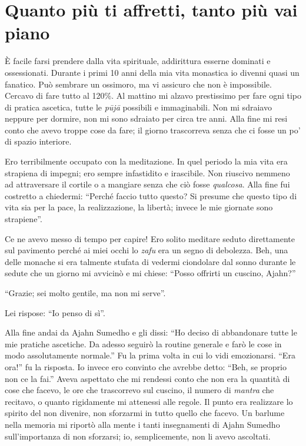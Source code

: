 \section*{Quanto pi\`u ti affretti, tanto pi\`u vai piano}

È facile farsi prendere dalla vita spirituale, addirittura esserne dominati e ossessionati. Durante i primi 10 anni della mia vita monastica io divenni quasi un fanatico. Può sembrare un ossimoro, ma vi assicuro che non è impossibile. Cercavo di fare tutto al 120\%. Al mattino mi alzavo prestissimo per fare ogni tipo di pratica ascetica, tutte le \textit{pūjā} possibili e immaginabili. Non mi sdraiavo neppure per dormire, non mi sono sdraiato per circa tre anni. Alla fine mi resi conto che avevo troppe cose da fare; il giorno trascorreva senza che ci fosse un po' di spazio interiore.

Ero terribilmente occupato con la meditazione. In quel periodo la mia vita era strapiena di impegni; ero sempre infastidito e irascibile. Non riuscivo nemmeno ad attraversare il cortile o a mangiare senza che ciò fosse \textit{qualcosa}. Alla fine fui costretto a chiedermi: ``Perché faccio tutto questo? Si presume che questo tipo di vita sia per la pace, la realizzazione, la libertà; invece le mie giornate sono strapiene''.

Ce ne avevo messo di tempo per capire! Ero solito meditare seduto direttamente sul pavimento perché ai miei occhi lo \textit{zafu} era un segno di debolezza. Beh, una delle monache si era talmente stufata di vedermi ciondolare dal sonno durante le sedute che un giorno mi avvicinò e mi chiese: ``Posso offrirti un cuscino, Ajahn?''

``Grazie; sei molto gentile, ma non mi serve''.

Lei rispose: ``Io penso di sì''.

Alla fine andai da Ajahn Sumedho e gli dissi: ``Ho deciso di abbandonare tutte le mie pratiche ascetiche. Da adesso seguirò la routine generale e farò le cose in modo assolutamente normale.'' Fu la prima volta in cui lo vidi emozionarsi. ``Era ora!'' fu la risposta. Io invece ero convinto che avrebbe detto: ``Beh, se proprio non ce la fai.'' Aveva aspettato che mi rendessi conto che non era la quantità di cose che facevo, le ore che trascorrevo sul cuscino, il numero di \textit{mantra} che recitavo, o quanto rigidamente mi attenessi alle regole. Il punto era realizzare lo spirito del non divenire, non sforzarmi in tutto quello che facevo. Un barlume nella memoria mi riportò alla mente i tanti insegnamenti di Ajahn Sumedho sull'importanza di non sforzarsi; io, semplicemente, non li avevo ascoltati.

